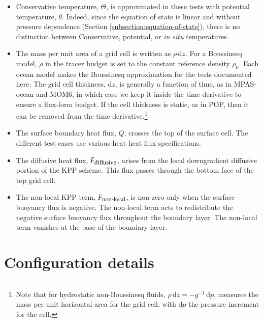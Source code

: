 \begin{itemize}

\item Conservative temperature, $\Theta$, is approximated in these
  tests with potential temperature, $\theta$.  Indeed, since the
  equation of state is linear and without pressure dependence (Section
  \ref{subsection:equation-of-state}), there is no distinction between
  Conservative, potential, or {\it in situ} temperatures.

\item The mass per unit area of a grid cell is written as $\rho \,
  \mathrm{d}z$.  For a Boussinesq model, $\rho$ in the tracer budget
  is set to the constant reference density $\rho_{0}$.  Each ocean
  model makes the Boussinesq approximation for the tests documented
  here.  The grid cell thickness, $\mathrm{d}z$, is generally a
  function of time, as in MPAS-ocean and MOM6, in which case we keep
  it inside the time derivative to ensure a flux-form budget.  If the
  cell thickness is static, as in POP, then it can be removed from the
  time derivative.\footnote{Note that for hydrostatic non-Boussinesq
    fluids, $\rho \, \mathrm{d}z = -g^{-1} \, \mathrm{d}p$, measures
    the mass per unit horizontal area for the grid cell, with
    $\mathrm{d}p$ the pressure increment for the cell.}

\item The surface boundary heat flux, $Q$, crosses the top of the
  surface cell.  The different test cases use various heat heat flux
  specifications.

\item The diffusive heat flux, $F_{\mbox{\footnotesize diffusive}}$,
  arises from the local downgradient diffusive portion of the KPP
  scheme.  This flux passes through the bottom face of the top grid
  cell.

\item The non-local KPP term, $F_{\mbox{\footnotesize non-local}}$, is
  non-zero only when the surface buoyancy flux is negative.  The
  non-local term acts to redistribute the negative surface buoyancy
  flux throughout the boundary layer.  The non-local term vanishes at
  the base of the boundary layer.

\end{itemize}




\section{Configuration details}
\label{section:configuration-details-winds_alone}

